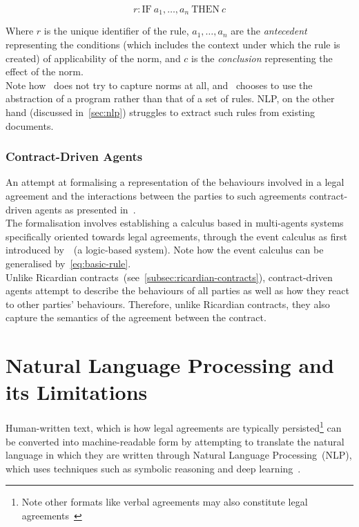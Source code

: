 \begin{equation}
    \label{eq:basic-rule}
    r: \text{IF} \  a_{1}, \dots ,a_n \ \text{THEN} \ c
\end{equation}

Where $r$ is the unique identifier of the rule, $a_1, \dots, a_n $ are the \emph{antecedent} representing the conditions (which includes the context under which the rule is created) of applicability of the norm, and $c$ is the \emph{conclusion} representing the effect of the norm.\\

Note how~ does not try to capture norms at all, and~ chooses to use the abstraction of a program rather than that of a set of rules.
NLP, on the other hand (discussed in~\autoref{sec:nlp}) struggles to extract such rules from existing documents.

\subsubsection{Contract-Driven Agents}\label{subsubsec:contract-driven-agents}

An attempt at formalising a representation of the behaviours involved in a legal agreement and the interactions between the parties to such agreements contract-driven agents as presented in~\cite{knottenbeltContractDriven}.\\

The formalisation involves establishing a calculus based in multi-agents systems specifically oriented towards legal agreements, through the event calculus as first introduced by~\cite{kowalski1989logicEventBased}~(a logic-based system).
Note how the event calculus can be generalised by~\autoref{eq:basic-rule}.\\

Unlike Ricardian contracts~(see~\autoref{subsec:ricardian-contracts}), contract-driven agents attempt to describe the behaviours of all parties as well as how they react to other parties' behaviours.
Therefore, unlike Ricardian contracts, they also capture the semantics of the agreement between the contract.


\section{Natural Language Processing and its Limitations}\label{sec:nlp}

Human-written text, which is how legal agreements are typically persisted\footnote{Note other formats like verbal agreements may also constitute legal agreements~\cite{larsonContractLawIntro}} can be converted into machine-readable form by attempting to translate the natural language in which they are written through Natural Language Processing~(NLP), which uses techniques such as symbolic reasoning and deep learning~\cite{GoldbergNLPReview}.\\

